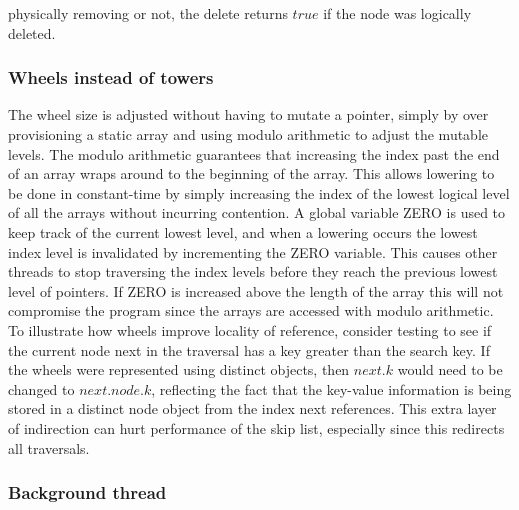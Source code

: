 \documentclass{article}
\begin{document}
physically removing or not, the delete returns $true$ if the node was logically deleted.

\subsubsection{Wheels instead of towers}
\label{ssec:wiot}

The wheel size is adjusted without having to mutate a pointer, simply by over provisioning a static array and using modulo arithmetic to adjust the mutable levels. The modulo arithmetic guarantees that increasing the index past the end of an array wraps around to the beginning of the array. This allows lowering to be done in constant-time by simply increasing the index of the lowest logical level of all the arrays without incurring contention. A global variable ZERO is used to keep track of the current lowest level, and when a lowering occurs the lowest index level is invalidated by incrementing the ZERO variable. This causes other threads to stop traversing the index levels before they reach the previous lowest level of pointers. If ZERO is increased above the length of the array this will not compromise the program since the arrays are accessed with modulo arithmetic. To illustrate how wheels improve locality of reference, consider testing to see if the current node next in the traversal has a key greater than the search key. If the wheels were represented using distinct objects, then $next.k$ would need to be changed to $next.node.k$, reflecting the fact that the key-value information is being stored in a distinct node object from the index next references. This extra layer of indirection can hurt performance of the skip list, especially since this redirects all traversals.

\subsubsection{Background thread}
\label{ssec:bt}
\end{document}
